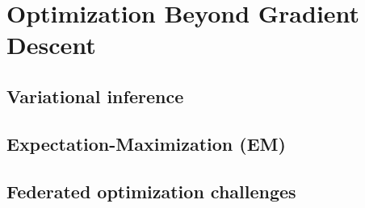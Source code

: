 ﻿\chapter{Optimization Beyond Gradient Descent}
\section{Variational inference}

\section{Expectation-Maximization (EM)}

\section{Federated optimization challenges}


